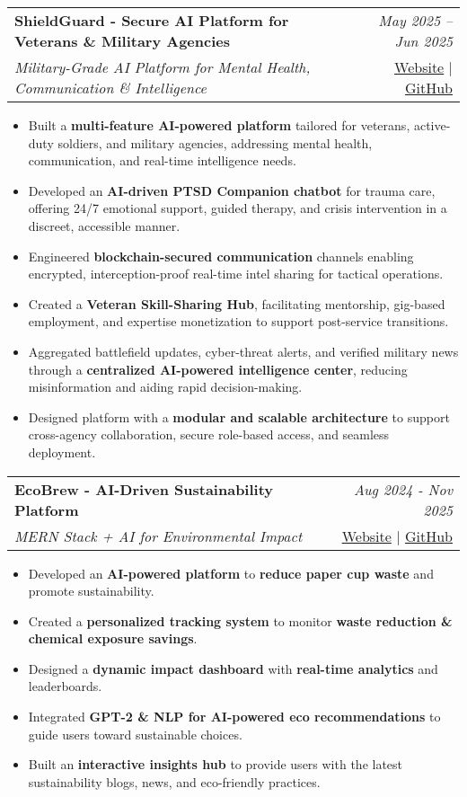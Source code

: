 \documentclass[a4paper,11pt]{article}
\makeatletter
\newcommand{\resumeProject}[4]{
\vspace{0.5mm}\item
    \begin{tabular*}{0.98\textwidth}[t]{l@{\extracolsep{\fill}}r}
        \textbf{#1} & \textit{\footnotesize{#3}} \\
        \footnotesize{\textit{#2}} & \footnotesize{#4}
    \end{tabular*}
    \vspace{-2.4mm}
}
\newcommand{\resumeItemListStart}{\begin{itemize}[leftmargin=*,labelsep=1mm,itemsep=0.5mm]}
\newcommand{\resumeItemListEnd}{\end{itemize}\vspace{-2mm}}
\makeatother
\begin{document}
\resumeProject
    {ShieldGuard - Secure AI Platform for Veterans \& Military Agencies}
    {Military-Grade AI Platform for Mental Health, Communication \& Intelligence}
    {May 2025 -- Jun 2025}
    {\href{https://shield-guard.vercel.app/}{Website} | \href{https://github.com/THE-DEEPDAS/ShieldGuard}{GitHub}}

\resumeItemListStart
    \item Built a \textbf{multi-feature AI-powered platform} tailored for veterans, active-duty soldiers, and military agencies, addressing mental health, communication, and real-time intelligence needs.
    \item Developed an \textbf{AI-driven PTSD Companion chatbot} for trauma care, offering 24/7 emotional support, guided therapy, and crisis intervention in a discreet, accessible manner.
    \item Engineered \textbf{blockchain-secured communication} channels enabling encrypted, interception-proof real-time intel sharing for tactical operations.
    \item Created a \textbf{Veteran Skill-Sharing Hub}, facilitating mentorship, gig-based employment, and expertise monetization to support post-service transitions.
    \item Aggregated battlefield updates, cyber-threat alerts, and verified military news through a \textbf{centralized AI-powered intelligence center}, reducing misinformation and aiding rapid decision-making.
    \item Designed platform with a \textbf{modular and scalable architecture} to support cross-agency collaboration, secure role-based access, and seamless deployment.
\resumeItemListEnd

\resumeProject
    {EcoBrew - AI-Driven Sustainability Platform}
    {MERN Stack + AI for Environmental Impact}
    {Aug 2024 - Nov 2025}
    {{}\href{https://ecobrew.highintoxic.tech/}{Website} | \href{https://github.com/THE-DEEPDAS/Eco-Brew}{GitHub}}
\resumeItemListStart
    \item Developed an \textbf{AI-powered platform} to \textbf{reduce paper cup waste} and promote sustainability.
    \item Created a \textbf{personalized tracking system} to monitor \textbf{waste reduction \& chemical exposure savings}.
    \item Designed a \textbf{dynamic impact dashboard} with \textbf{real-time analytics} and leaderboards.
    \item Integrated \textbf{GPT-2 \& NLP for AI-powered eco recommendations} to guide users toward sustainable choices.
    \item Built an \textbf{interactive insights hub} to provide users with the latest sustainability blogs, news, and eco-friendly practices.
\resumeItemListEnd
\end{document}
